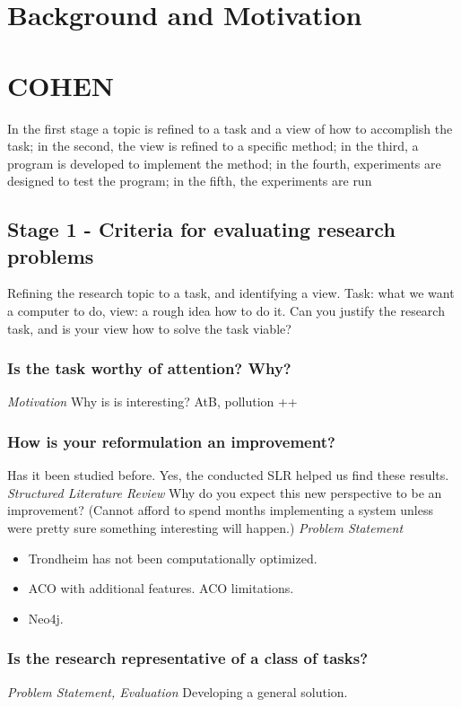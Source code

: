 \section{Background and Motivation}

\section{COHEN}

In the first stage a topic is refined to a task and a view of how to accomplish the task; in the second, the view is refined to a specific method; in the third, a program is developed to implement the method; in the fourth, experiments are designed to test the program; in the fifth, the experiments are run\citep{cohen88}

\subsection{Stage 1 - Criteria for evaluating research problems}
Refining the research topic to a task, and identifying a view.
Task: what we want a computer to do, view: a rough idea how to do it. Can you justify the research task, and is your view how to solve the task viable? 

\subsubsection{Is the task worthy of attention? Why?}
\emph{\color{orange} Motivation}
Why is is interesting? AtB, pollution ++ 

\subsubsection{How is your reformulation an improvement?}
Has it been studied before. Yes, the conducted SLR helped us find these results.\emph{\color{orange} Structured Literature Review}
Why do you expect this new perspective to be an improvement? (Cannot afford to spend months implementing a system unless were pretty sure something interesting will happen.)\emph{\color{orange} Problem Statement}
\begin{itemize}
\item Trondheim has not been computationally optimized.
\item ACO with additional features. ACO limitations.
\item Neo4j.
\end{itemize}

\subsubsection{Is the research representative of a class of tasks?}
\emph{\color{orange} Problem Statement, Evaluation}
Developing a general solution.

